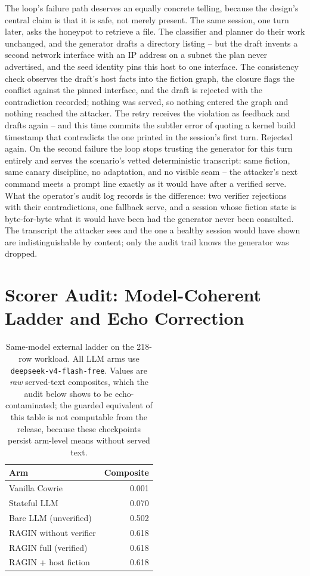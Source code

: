 The loop's failure path deserves an equally concrete telling, because
the design's central claim is that it is safe, not merely present. The
same session, one turn later, asks the honeypot to retrieve a file. The
classifier and planner do their work unchanged, and the generator
drafts a directory listing -- but the draft invents a second network
interface with an IP address on a subnet the plan never advertised, and
the seed identity pins this host to one interface. The consistency
check observes the draft's host facts into the fiction graph, the
closure flags the conflict against the pinned interface, and the draft
is rejected with the contradiction recorded; nothing was served, so
nothing entered the graph and nothing reached the attacker. The retry
receives the violation as feedback and drafts again -- and this time
commits the subtler error of quoting a kernel build timestamp that
contradicts the one printed in the session's first turn. Rejected
again. On the second failure the loop stops trusting the generator for
this turn entirely and serves the scenario's vetted deterministic
transcript: same fiction, same canary discipline, no adaptation, and no
visible seam -- the attacker's next command meets a prompt line exactly
as it would have after a verified serve. What the operator's audit log
records is the difference: two verifier rejections with their
contradictions, one fallback serve, and a session whose fiction state
is byte-for-byte what it would have been had the generator never been
consulted. The transcript the attacker sees and the one a healthy
session would have shown are indistinguishable by content; only the
audit trail knows the generator was dropped.

\section{Scorer Audit: Model-Coherent Ladder and Echo Correction}
\label{app:scorerdetail}
\begin{table}[t]
\centering
\caption{Same-model external ladder on the 218-row workload. All LLM arms
use \texttt{deepseek-v4-flash-free}. Values are \emph{raw} served-text
composites, which the audit below shows to be echo-contaminated; the guarded
equivalent of this table is not computable from the release, because these
checkpoints persist arm-level means without served text.}
\label{tab:baseline-served-text}
\scriptsize
\begin{tabular}{lr}
\toprule
Arm & Composite \\
\midrule
Vanilla Cowrie & 0.001 \\
Stateful LLM & 0.070 \\
Bare LLM (unverified) & 0.502 \\
RAGIN without verifier & 0.618 \\
RAGIN full (verified) & 0.618 \\
RAGIN + host fiction & 0.618 \\
\bottomrule
\end{tabular}
\end{table}

